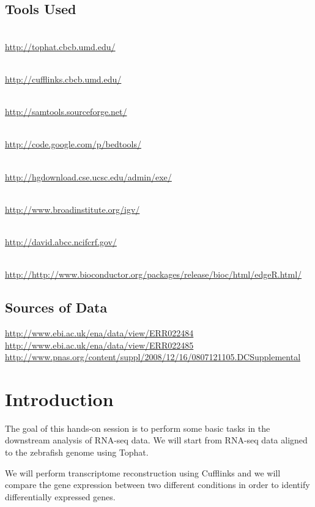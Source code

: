\subsection{Tools Used}
\begin{description}[style=multiline,labelindent=0cm,align=left,leftmargin=1cm]
  \item[Tophat] \hfill\\
    \url{http://tophat.cbcb.umd.edu/}
  \item[Cufflinks] \hfill\\
    \url{http://cufflinks.cbcb.umd.edu/}
  \item[Samtools] \hfill\\
    \url{http://samtools.sourceforge.net/}
  \item[BEDTools] \hfill\\
    \url{http://code.google.com/p/bedtools/}
  \item[UCSC tools] \hfill\\
    \url{http://hgdownload.cse.ucsc.edu/admin/exe/}
  \item[IGV] \hfill\\
    \url{http://www.broadinstitute.org/igv/}
  \item[DAVID Functional Analysis] \hfill\\
    \url{http://david.abcc.ncifcrf.gov/}
  \item[edgeR pakcage] \hfill\\
    \url{http://http://www.bioconductor.org/packages/release/bioc/html/edgeR.html/}
\end{description}

\subsection{Sources of Data}
\url{http://www.ebi.ac.uk/ena/data/view/ERR022484}\\
\url{http://www.ebi.ac.uk/ena/data/view/ERR022485}
\url{http://www.pnas.org/content/suppl/2008/12/16/0807121105.DCSupplemental}

\newpage

\section{Introduction}
The goal of this hands-on session is to perform some basic tasks in the
downstream analysis of RNA-seq data. We will start from RNA-seq data aligned to
the zebrafish genome using Tophat.

We will perform transcriptome reconstruction using Cufflinks and we will compare
the gene expression between two different conditions in order to identify
differentially expressed genes.

